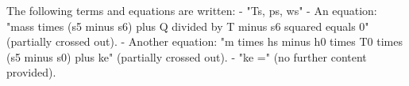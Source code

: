 The following terms and equations are written:  
- "Ts, ps, ws"  
- An equation: "mass times (s5 minus s6) plus Q divided by T minus s6 squared equals 0" (partially crossed out).  
- Another equation: "m times hs minus h0 times T0 times (s5 minus s0) plus ke" (partially crossed out).  
- "ke =" (no further content provided).